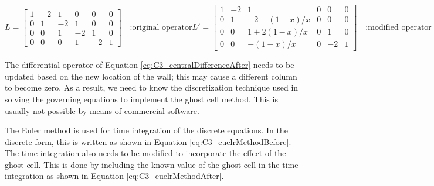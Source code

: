 \begin{subequations}
\begin{equation}\label{eq:C3_centralDifferenceBefore}
    L = 
    \begin{bmatrix}
    1 & -2 & 1 & 0 & 0 & 0 \\
    0 & 1 & -2 & 1 & 0 & 0 \\
    0 & 0 & 1 & -2 & 1 & 0 \\
    0 & 0 & 0 & 1 & -2 & 1
    \end{bmatrix} \quad \text{:original operator}
\end{equation}
\begin{equation}\label{eq:C3_centralDifferenceAfter}
    L' = 
    \begin{bmatrix}
    1 & -2 & 1 & 0 & 0 & 0 \\
    0 & 1 & -2-(1-x)/x & 0 & 0 & 0 \\
    0 & 0 & 1+2(1-x)/x & 0 & 1 & 0 \\
    0 & 0 & -(1-x)/x & 0 & -2 & 1
    \end{bmatrix} \quad \text{:modified operator}
\end{equation}
\end{subequations}

The differential operator of Equation \eqref{eq:C3_centralDifferenceAfter} needs to be updated based on the new location of the wall; this may cause a different column to become zero. As a result, we need to know the discretization technique used in solving the governing equations to implement the ghost cell method. This is usually not possible by means of commercial software.

The Euler method is used for time integration of the discrete equations. In the discrete form, this is written as shown in Equation \eqref{eq:C3_euelrMethodBefore}. The time integration also needs to be modified to incorporate the effect of the ghost cell. This is done by including the known value of the ghost cell in the time integration as shown in Equation \eqref{eq:C3_euelrMethodAfter}.

